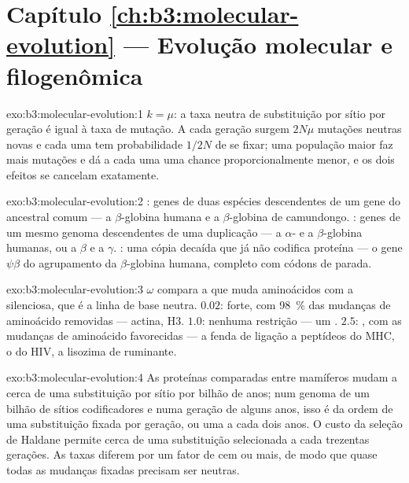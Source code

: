 \section*{Capítulo \ref{ch:b3:molecular-evolution} --- Evolução molecular e filogenômica}

\begin{solution}{exo:b3:molecular-evolution:1}
$k = \mu$: a taxa neutra de substituição por sítio por geração é igual à
taxa de mutação. A cada geração surgem $2N\mu$ mutações neutras novas e
cada uma tem probabilidade $1/2N$ de se fixar; uma população maior faz
mais mutações e dá a cada uma uma chance proporcionalmente menor, e os
dois efeitos se cancelam exatamente.
\end{solution}

\begin{solution}{exo:b3:molecular-evolution:2}
: genes de duas espécies descendentes de um gene do ancestral
comum --- a $\beta$-globina humana e a $\beta$-globina de camundongo.
: genes de um mesmo genoma descendentes de uma duplicação --- a
$\alpha$- e a $\beta$-globina humanas, ou a $\beta$ e a $\gamma$.
: uma cópia decaída que já não codifica proteína --- o gene
$\psi\beta$ do agrupamento da $\beta$-globina humana, completo com
códons de parada.
\end{solution}

\begin{solution}{exo:b3:molecular-evolution:3}
$\omega$ compara a  que muda aminoácidos com a  silenciosa, que é a linha de base neutra. $0.02$:  forte, com \qty{98}{\%} das mudanças de aminoácido removidas
--- actina,  H3. $1.0$: nenhuma restrição --- um .
$2.5$: , com as mudanças de aminoácido favorecidas --- a
fenda de ligação a peptídeos do MHC, o  do HIV, a lisozima de
ruminante.
\end{solution}

\begin{solution}{exo:b3:molecular-evolution:4}
As proteínas comparadas entre mamíferos mudam a cerca de uma substituição
por sítio por bilhão de anos; num genoma de um bilhão de sítios
codificadores e numa geração de alguns anos, isso é da ordem de uma
substituição fixada por geração, ou uma a cada dois anos. O custo da
seleção de Haldane permite cerca de uma substituição selecionada a cada
trezentas gerações. As taxas diferem por um fator de cem ou mais, de modo
que quase todas as mudanças fixadas precisam ser neutras.
\end{solution}


